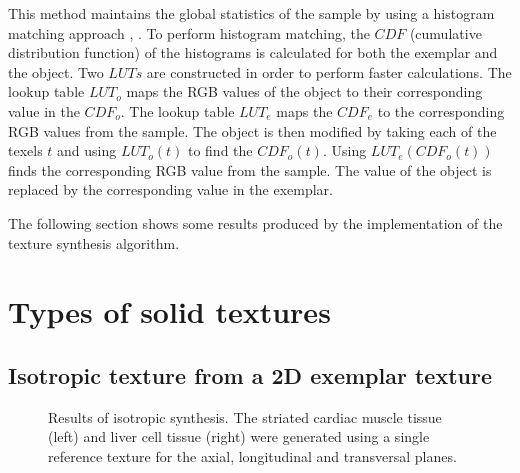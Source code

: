 This method maintains the global statistics of the sample by using a histogram matching approach \cite{ROLLAND2000}, \cite{Heeger:1995:PTA:218380.218446}.
To perform histogram matching, the $CDF$ (cumulative distribution function) of the histograms 
is calculated for both the exemplar and the object. 
Two $LUTs$ are constructed in order to perform faster calculations. 
The lookup table $LUT_o$ maps the RGB values of the object
to their corresponding value in the $CDF_o$. 
The lookup table $LUT_e$ maps the $CDF_e$
to the corresponding RGB values from the sample. 
The object is then modified by taking each of the texels $t$ and using $LUT_o(t)$ to find the $CDF_o(t)$.
Using $LUT_e(CDF_o(t))$ finds the corresponding RGB value from the sample. 
The value of the object is replaced by the corresponding value in the exemplar.


The following section shows some results produced by the implementation of the 
texture synthesis algorithm. 

\section{Types of solid textures}
\label{sec:TextureSynthesisResults}


\subsection{Isotropic texture from a 2D exemplar texture}

\begin{figure}[h!]
 \centering
 \caption[Isotropic texture synthesis.]{Results of isotropic synthesis. The striated cardiac muscle tissue (left)
          and liver cell tissue (right) were generated using a single reference texture 
          for the axial, longitudinal and transversal planes.
         }
 \label{fig:isotropicsynthesis} 
\end{figure}

